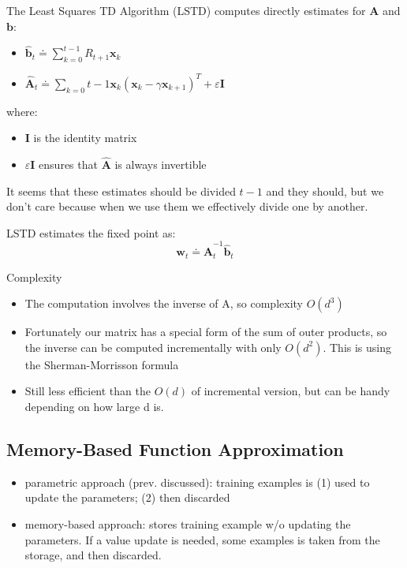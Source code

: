 \documentclass[sutton_barto_notes.tex]{subfiles}
\begin{document}
 The Least Squares TD Algorithm (LSTD) computes directly estimates for $\mathbf{A}$ and $\mathbf{b}$: 

\begin{itemize}
\item $\hat{\mathbf{b}}_t \doteq \sum_{k=0}^{t-1} R_{t+1} \mathbf{x}_k$ 
\item $\hat{\mathbf{A}}_t \doteq \sum_{k=0}{t-1} \mathbf{x}_k(\mathbf{x}_k - \gamma \mathbf{x}_{k+1})^T + \varepsilon \mathbf{I}$ 
\end{itemize}

 where: 
\begin{itemize}
\item $\mathbf{I}$ is the identity matrix 
\item $\varepsilon \mathbf{I}$ ensures that $\hat{\mathbf{A}}$ is always invertible 
\end{itemize}

 It seems that these estimates should be divided $t - 1$ and they should, but we don’t care because when we use them we effectively divide one by another. 

 LSTD estimates the fixed point as: 
$$ \mathbf{w}_{t} \doteq \hat{\mathbf{A}}_t^{-1}\hat{\mathbf{b}}_t $$

 Complexity 
\begin{itemize}
\item The computation involves the inverse of A, so complexity $O(d^3)$ 
\item Fortunately our matrix has a special form of the sum of outer products, so the inverse can be computed incrementally with only $O(d^2)$. This is using the Sherman-Morrisson formula 
\item Still less efficient than the $O(d)$ of incremental version, but can be handy depending on how large d is. 
\end{itemize}

\subsection{Memory-Based Function Approximation}

\begin{itemize}
\item parametric approach (prev. discussed): training examples is (1) used to update the parameters; (2) then discarded
\item memory-based approach: stores training example w/o updating the parameters. If a value update is needed, some examples is taken from the storage, and then discarded.
\end{itemize}
\end{document}
